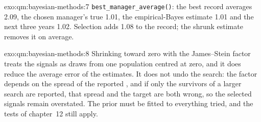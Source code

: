 \begin{solution}{exo:qm:bayesian-methods:7}
\texttt{best\_manager\_average()}: the best record averages 2.09, the chosen manager's true  1.01, the empirical-Bayes estimate
1.01 and the next three years 1.02. Selection adds 1.08 to the record; the shrunk estimate removes it on average.
\end{solution}

\begin{solution}{exo:qm:bayesian-methods:8}
Shrinking toward zero with the James--Stein factor treats the signals as draws from one population centred at zero, and it does reduce the
average error of the estimates. It does not undo the search: the factor depends on the spread of the reported , and if only the
survivors of a larger search are reported, that spread and the target are both wrong, so the selected signals remain overstated. The prior
must be fitted to everything tried, and the tests of chapter~12 still apply.
\end{solution}

